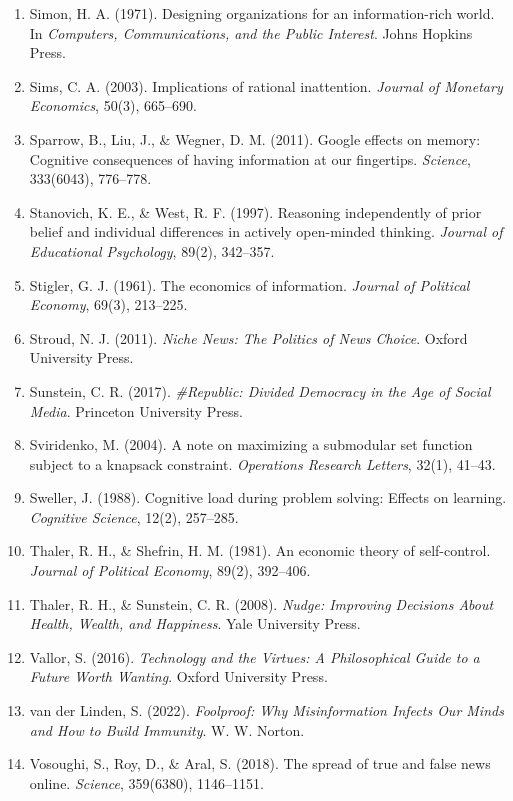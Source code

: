 \documentclass[
  11pt]{article}
\begin{document}
\begin{enumerate}
{  Quarterly Journal of Economics}, 69(1), 99--118.
\item
  Simon, H. A. (1971). Designing organizations for an information-rich
  world. In \emph{Computers, Communications, and the Public Interest}.
  Johns Hopkins Press.
\item
  Sims, C. A. (2003). Implications of rational inattention.
  \emph{Journal of Monetary Economics}, 50(3), 665--690.
\item
  Sparrow, B., Liu, J., \& Wegner, D. M. (2011). Google effects on
  memory: Cognitive consequences of having information at our
  fingertips. \emph{Science}, 333(6043), 776--778.
\item
  Stanovich, K. E., \& West, R. F. (1997). Reasoning independently of
  prior belief and individual differences in actively open-minded
  thinking. \emph{Journal of Educational Psychology}, 89(2), 342--357.
\item
  Stigler, G. J. (1961). The economics of information. \emph{Journal of
  Political Economy}, 69(3), 213--225.
\item
  Stroud, N. J. (2011). \emph{Niche News: The Politics of News Choice}.
  Oxford University Press.
\item
  Sunstein, C. R. (2017). \emph{\#Republic: Divided Democracy in the Age
  of Social Media}. Princeton University Press.
\item
  Sviridenko, M. (2004). A note on maximizing a submodular set function
  subject to a knapsack constraint. \emph{Operations Research Letters},
  32(1), 41--43.
\item
  Sweller, J. (1988). Cognitive load during problem solving: Effects on
  learning. \emph{Cognitive Science}, 12(2), 257--285.
\item
  Thaler, R. H., \& Shefrin, H. M. (1981). An economic theory of
  self-control. \emph{Journal of Political Economy}, 89(2), 392--406.
\item
  Thaler, R. H., \& Sunstein, C. R. (2008). \emph{Nudge: Improving
  Decisions About Health, Wealth, and Happiness}. Yale University Press.
\item
  Vallor, S. (2016). \emph{Technology and the Virtues: A Philosophical
  Guide to a Future Worth Wanting}. Oxford University Press.
\item
  van der Linden, S. (2022). \emph{Foolproof: Why Misinformation Infects
  Our Minds and How to Build Immunity}. W. W. Norton.
\item
  Vosoughi, S., Roy, D., \& Aral, S. (2018). The spread of true and
  false news online. \emph{Science}, 359(6380), 1146--1151.

\end{enumerate}
\end{document}
